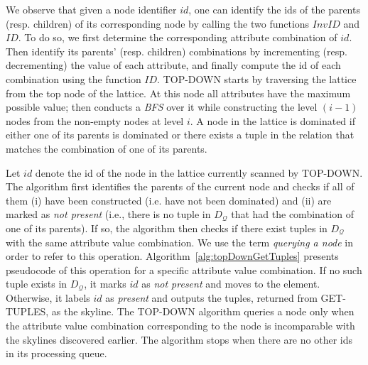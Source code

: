 We observe that given a node identifier $id$, one can identify the ids of the parents (resp. children) 
of its corresponding node by calling the two functions $InvID$ and $ID$.
To do so, we first determine the corresponding attribute combination of $id$. Then identify its parents' (resp. children) 
combinations by incrementing (resp. decrementing) the value of each attribute, and finally compute the id of each combination using the function $ID$.
TOP-DOWN starts by traversing the lattice from the top node of the lattice. At this node all attributes have the maximum possible value; then conducts
 a {\em BFS} over it while constructing the level $(i-1)$ nodes from the non-empty nodes at level $i$. A node in the lattice 
is dominated if either one of its parents is dominated or there exists a tuple in the relation that matches the combination of one of its parents.

Let $id$ denote the id of the node in the lattice currently scanned by TOP-DOWN. The algorithm first identifies the parents of the current node and checks if all of them (i) have been constructed (i.e. have not been dominated) and (ii) are marked as \textit{not present} (i.e., there is no tuple in $D_{\mathcal{Q}}$ that had the combination of one of its parents).
If so, the algorithm then checks if there exist tuples in $D_{\mathcal{Q}}$ with the same attribute value combination. We use the term \textit{querying a node} in order to refer to this operation. Algorithm~\ref{alg:topDownGetTuples} presents pseudocode of this operation for a specific attribute value combination. If no such tuple exists in $D_\mathcal{Q}$, it marks $id$ as \textit{not present} and moves to the element. Otherwise, it labels $id$ as \textit{present} and outputs the tuples, returned from GET-TUPLES, as the skyline. The TOP-DOWN algorithm queries a node only when the attribute value combination corresponding to the node is incomparable with the skylines discovered earlier. The algorithm stops when there are no other ids in its processing queue.


